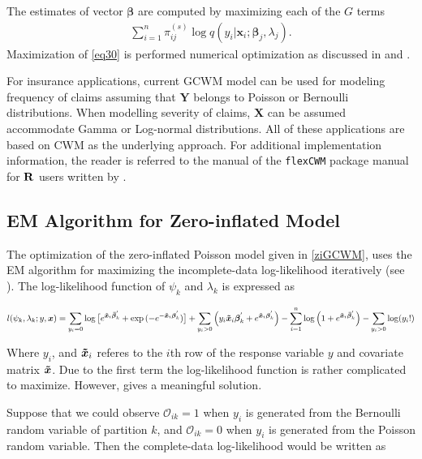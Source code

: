 \documentclass[11pt,letterpaper]{article}
\numberwithin{equation}{section}
\numberwithin{equation}{section}
\numberwithin{equation}{section}
\begin{document}
The estimates of vector $\bm\beta$ are computed by maximizing each of the $G$ terms
\begin{align}
\sum_{i=1}^{n}\pi^{(s)}_{ij} \log{q}(y_i|\bm x_i;\bm \beta_j,\lambda_j).
\label{eq30}
\end{align}
Maximization of \eqref{eq30} is performed numerical optimization as discussed in \cite{Wedel+DeSabro:1995} and \cite{Wedel:2002}.

For insurance applications, current GCWM model can be used for modeling frequency of claims assuming that $\bm{Y}$ belongs to Poisson or Bernoulli distributions. When modelling severity of claims, $\bm{X}$ can be assumed accommodate Gamma or Log-normal distributions. All of these applications are based on CWM as the underlying approach. For additional implementation information, the reader is referred to the manual of the {\tt flexCWM} package manual for ${\bf R}$ users written by \cite{Ingrassia+Punzo+Vittadini+Minotti:2015}.%
\subsection{EM Algorithm for Zero-inflated Model} 
The optimization of the zero-inflated Poisson model given in \eqref{ziGCWM}, uses the EM algorithm for maximizing the incomplete-data log-likelihood iteratively (see \cite{Lambert}). The log-likelihood function of $\psi_k$ and $\lambda_k$ is expressed as

\begin{align*}
l(\psi_k,\lambda_k; y, \bm{x}) = \sum_{y_i = 0} \log \big[ e^{ \bm{ \bm{\tilde{x}}}_i \bm{\bar{\beta}}_k^{'}  } + \exp{( - e^ { -\bm{\bm{\tilde{x}}}_i \bm{\beta}_k^{'} })} \big] + \sum_{y_i > 0 } \left( y_i \bm{\tilde{x}}_i \bm{\beta}_k^{'} + e^{ \bm{\tilde{x}}_i \bm{\beta}_k^{'} } \right) - \sum_{i=1}^n  \log \left(1 + e^ {\bm{\tilde{x}}_i \bm{\bar{\beta}}_k^{'} } \right) - \sum_{y_i > 0} \log(y_i ! )
\end{align*}

Where $y_i$, and $\bm{\tilde{x}}_i$ referes to the $i$th row of the response variable $y$ and covariate matrix $\bm{\tilde{x}}$. Due to the first term the log-likelihood function is rather complicated to maximize. However, \cite{Lambert} gives a meaningful solution. 

Suppose that we could observe ${\mathcal{O}_{ik}} = 1$ when $y_i$ is generated from the Bernoulli random variable of partition $k$, and $\mathcal{O}_{ik} = 0$ when $y_i$ is generated from the Poisson random variable. Then the complete-data log-likelihood would be written as
\end{document}
